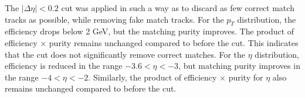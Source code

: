             The \( |\Delta \eta| < 0.2 \) cut was applied in such a way as to discard as few correct match tracks as possible, while removing fake match tracks. For the \( p_T \) distribution, the efficiency drops below 2 GeV, but the matching purity improves. The product of efficiency \(\times\) purity remains unchanged compared to before the cut. This indicates that the cut does not significantly remove correct matches. For the \(\eta\) distribution, efficiency is reduced in the range \( -3.6 < \eta < -3 \), but matching purity improves in the range \( -4 < \eta < -2 \). Similarly, the product of efficiency \(\times\) purity for \(\eta\) also remains unchanged compared to before the cut.